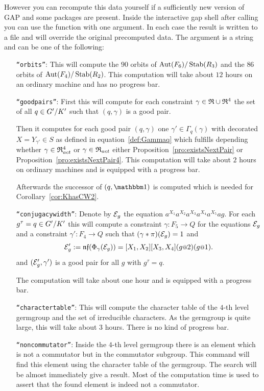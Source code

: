 \documentclass[a4paper,11pt]{amsart}
\begin{document}
However you can recompute this data yourself if a sufficiently new version of GAP and
some packages are present. Inside the interactive gap shell after calling 
you can use the function  with one argument. In each case
the result is written to a file and will override the original precomputed data. The 
argument is a string and can be one of the following:
\begin{itemize}
    \item [\texttt{``orbits''}:] This will compute the $90$ orbits of ${\operatorname{{Aut}}(F_6)/\operatorname{Stab}(R_3)}$ and the
		       $86$ orbits of ${\operatorname{{Aut}}(F_4)/\operatorname{Stab}(R_2)}$. This computation will take
		       about $12$ hours on an ordinary machine and has no progress bar.
   \item [\texttt{``goodpairs''}:] First this will compute for each constraint $\gamma\in\mathfrak{R}\cup\mathfrak{R}^4$ 
		      the set of all $q\in{G'/K'}$ such that $(q,\gamma)$ is a good pair.
		      
		      Then it computes for each good pair $(q,\gamma)$ one $\gamma'\in\Gamma_q(\gamma)$
		      with decorated $X=Y_{\gamma'}\in S$ as defined in equation~\ref{def:Gammaq} which 
		      fulfills depending whether $\gamma\in\mathfrak{R}^4_{act}$ or $\gamma\in\mathfrak{R}_{act}$ 
		      either Proposition~\ref{pro:existsNextPair} or Proposition~\ref{pro:existsNextPair4}.
		      This computation will take about $2$ hours on ordinary machines and is equipped 
		      with a progress bar. 
		      
		      Afterwards the successor of $(q,\id)$ is computed which is needed for 
		      Corollary~\ref{cor:KhasCW2}. 
   \item [\texttt{``conjugacywidth''}:] Denote by $\mathcal{E}_g$ the equation $a^{X_1}a^{X_2}a^{X_3}a^{X_4}a^{X_5}ag$.
		      For each $g^\tau=q\in{G'/K'}$ this will compute a constraint 
		      $\gamma\colon F_5 \to Q$ for the equations $\mathcal{E}_g$
		      and a constraint $\gamma'\colon F_4\to Q$ such that
		      $(\gamma * \pi)(\mathcal{E}_g) = 1$ and 
		      \[\eq{E}'_g := \nf(\Phi_\gamma(\eq{E}_g))=[X_1,X_2][X_3,X_4](g\at{2})(g\at{1}).\] and
		      $(\mathcal{E}'_g,\gamma')$ is a good pair for all $g$ with $g^\tau=q$.
		      
		      The computation will take about one hour and is equipped with a progress bar.
   \item [\texttt{``charactertable''}:] This will compute the character table of the $4$-th level germgroup
		      and the set of irreducible characters. 
		      As the germgroup is quite large, this
		      will take about $3$ hours. There is no kind of progress bar.
   \item [\texttt{``noncommutator''}:] Inside the $4$-th level germgroup there is an element which is not
		      a commutator but in the commutator subgroup. This command will find this 
		      element using the character table of the germgroup. The search will be 
		      almost immediately give a result. Most of the computation time is used
		      to assert that the found element is indeed not a commutator.
		      

\end{itemize}
\end{document}
